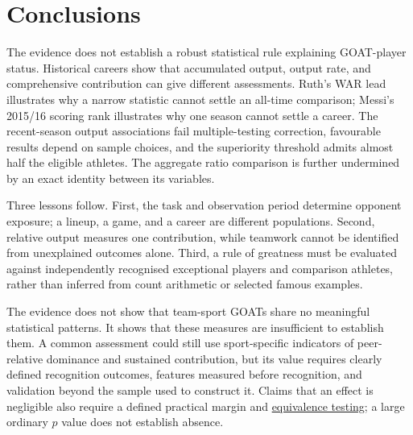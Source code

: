 \documentclass[11pt,letterpaper]{article}
\newcommand{\src}[2]{\href{#1}{#2}}
\begin{document}
\section{Conclusions}

The evidence does not establish a robust statistical rule explaining GOAT-player status.
Historical careers show that accumulated output, output rate, and comprehensive contribution can give different assessments.
Ruth's WAR lead illustrates why a narrow statistic cannot settle an all-time comparison; Messi's 2015/16 scoring rank illustrates why one season cannot settle a career.
The recent-season output associations fail multiple-testing correction, favourable results depend on sample choices, and the superiority threshold admits almost half the eligible athletes.
The aggregate ratio comparison is further undermined by an exact identity between its variables.

Three lessons follow.
First, the task and observation period determine opponent exposure; a lineup, a game, and a career are different populations.
Second, relative output measures one contribution, while teamwork cannot be identified from unexplained outcomes alone.
Third, a rule of greatness must be evaluated against independently recognised exceptional players and comparison athletes, rather than inferred from count arithmetic or selected famous examples.

The evidence does not show that team-sport GOATs share no meaningful statistical patterns.
It shows that these measures are insufficient to establish them.
A common assessment could still use sport-specific indicators of peer-relative dominance and sustained contribution, but its value requires clearly defined recognition outcomes, features measured before recognition, and validation beyond the sample used to construct it.
Claims that an effect is negligible also require a defined practical margin and \src{https://doi.org/10.1177/1948550617697177}{equivalence testing}; a large ordinary $p$ value does not establish absence.
\end{document}
